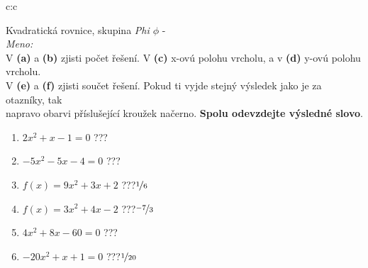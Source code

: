 \documentclass[10pt]{report}
\begin{document}
\clearpage
\thispagestyle{empty}
\begin{tabular}{c:c}
\begin{minipage}[c][99mm][t]{0.49\linewidth}
\begin{center}
\vspace{7mm}
{\huge Kvadratická rovnice, skupina \textit{Phi $\phi$} -}\\[4.5mm]
\textit{Meno:}\phantom{xxxxxxxxxxxxxxxxxxxxxxxxxxxxxxxxxxxxxxxxxxxxxxxxxxxxxxxxxxxxxxxxx}\\[3.5mm]
V \textbf{(a)} a \textbf{(b)} zjisti počet řešení. V \textbf{(c)} x-ovú polohu vrcholu, a v \textbf{(d)} y-ovú polohu vrcholu.\\V \textbf{(e)} a \textbf{(f)} zjisti součet řešení. Pokud ti vyjde stejný výsledek jako je za otazníky, tak\\napravo obarvi příslušející kroužek načerno. \textbf{Spolu odevzdejte výsledné slovo}.\\[3mm]
\begin{minipage}{0.77\linewidth}
\begin{center}
\begin{varwidth}{\textwidth}
\begin{enumerate}
\large
\item $2x^2+x-1=0$\quad \dotfill\; ???\;\dotfill {}
\item $-5x^2-5x-4=0$\quad \dotfill\; ???\;\dotfill {}
\item $f(x)=9x^2+3x+2$\quad \dotfill\; ???\;\dotfill \quad $\nicefrac{1}{6}$
\item $f(x)=3x^2+4x-2$\quad \dotfill\; ???\;\dotfill \quad $\nicefrac{-7}{3}$
\item $4x^2+8x-60=0$\quad \dotfill\; ???\;\dotfill {}
\item $-20x^2+x+1=0$\quad \dotfill\; ???\;\dotfill \quad $\nicefrac{1}{20}$
\end{enumerate}
\end{varwidth}
\end{center}
\end{minipage}

\end{center}
\end{minipage}
\end{tabular}
\end{document}
